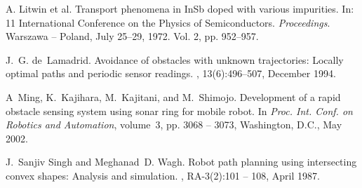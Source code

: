 \documentclass[11pt,twoside]{article}
\begin{document}
\begin{thebibliography}{99}
    A. Litwin et al. Transport phenomena in InSb doped with various impurities.
    In: 11 International Conference on the Physics of Semiconductors.
   {\em Proceedings}. Warszawa -- Poland, July 25--29, 
    1972. Vol. 2, pp. 952--957.

  J.~G. de~Lamadrid.
  \newblock Avoidance of obstacles with unknown trajectories: Locally optimal
   paths and periodic sensor readings.
   , 13(6):496--507,
   December 1994.

   A~Ming, K.~Kajihara, M.~Kajitani, and M.~Shimojo.
   \newblock Development of a rapid obstacle sensing system using sonar 
   ring for mobile robot.
   \newblock In {\em Proc. Int. Conf. on Robotics and Automation}, 
   volume~3, pp. 3068 -- 3073, Washington, D.C., May 2002.

   J.~Sanjiv Singh and Meghanad~D. Wagh.
   \newblock Robot path planning using intersecting convex shapes: Analysis and
   simulation.
   , RA-3(2):101 -- 108,
   April 1987.
\end{thebibliography}
\end{document}
